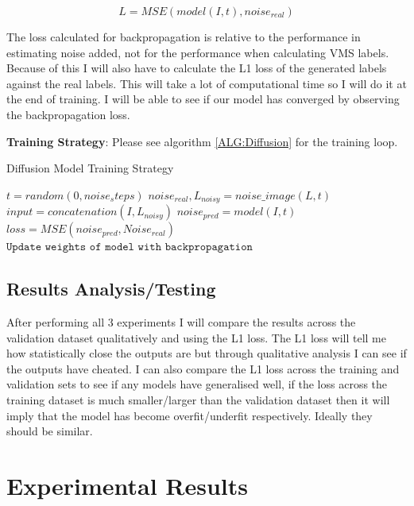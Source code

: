 \documentclass{UoYCSproject}
\begin{document}
\[ L = MSE( model(I, t), noise_{real} ) \]

The loss calculated for backpropagation is relative to the performance in estimating noise added, not for the performance when calculating VMS labels. Because of this I will also have to calculate the L1 loss of the generated labels against the real labels. This will take a lot of computational time so I will do it at the end of training. I will be able to see if our model has converged by observing the backpropagation loss. 

\textbf{Training Strategy}: Please see algorithm \ref{ALG:Diffusion} for the training loop.

\begin{algorithm}
\caption{Diffusion Model Training Strategy}\label{ALG:Diffusion}
\begin{algorithmic}[1]
\State
\State $t = random(0, noise_steps)$
\State $noise_{real}, L_{noisy} = noise\_image(L, t)$ 
\State
\State $input = concatenation(I, L_{noisy})$
\State $noise_{pred} = model(I, t)$
\State $loss = MSE( noise_{pred}, Noise_{real} )$
\State $\texttt{Update weights of model with backpropagation}$
\EndFor
\EndFor
\end{algorithmic}
\end{algorithm}

\section{Results Analysis/Testing}

After performing all 3 experiments I will compare the results across the validation dataset qualitatively and using the L1 loss. The L1 loss will tell me how statistically close the outputs are but through qualitative analysis I can see if the outputs have cheated. 
I can also compare the L1 loss across the training and validation sets to see if any models have generalised well, if the loss across the training dataset is much smaller/larger than the validation dataset then it will imply that the model has become overfit/underfit respectively. Ideally they should be similar. 


\chapter{Experimental Results}
\end{document}
